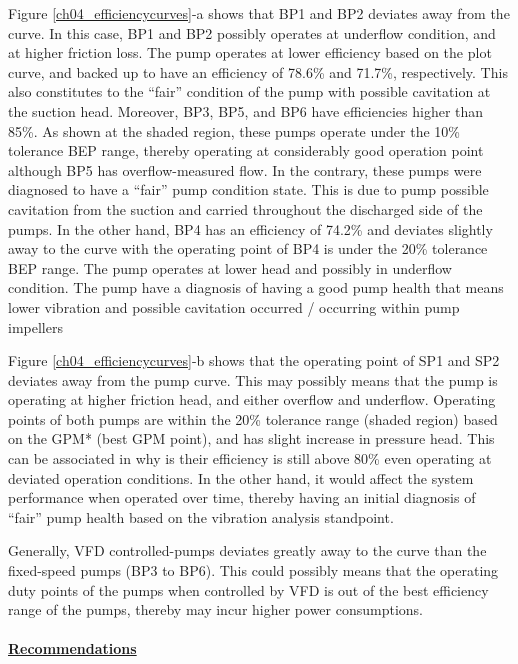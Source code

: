 Figure \ref{ch04_efficiencycurves}-a shows that BP1 and BP2 deviates away from the curve. In this case, BP1 and BP2 possibly operates at underflow condition, and at higher friction loss. The pump operates at lower efficiency based on the plot curve, and backed up to have an efficiency of 78.6\% and 71.7\%, respectively. This also constitutes to the “fair” condition of the pump with possible cavitation at the suction head. Moreover, BP3, BP5, and BP6 have efficiencies higher than 85\%. As shown at the shaded region, these pumps operate under the 10\% tolerance BEP range, thereby operating at considerably good operation point although BP5 has overflow-measured flow. In the contrary, these pumps were diagnosed to have a “fair” pump condition state. This is due to pump possible cavitation from the suction and carried throughout the discharged side of the pumps. In the other hand, BP4 has an efficiency of 74.2\% and deviates slightly away to the curve with the operating point of BP4 is under the 20\% tolerance BEP range. The pump operates at lower head and possibly in underflow condition. The pump have a diagnosis of having a good pump health that means lower vibration and possible cavitation occurred / occurring within pump impellers

Figure \ref{ch04_efficiencycurves}-b shows that the operating point of SP1 and SP2 deviates away from the pump curve. This may possibly means that the pump is operating at higher friction head, and either overflow and underflow. Operating points of both pumps are within the 20\% tolerance range (shaded region) based on the GPM* (best GPM point), and has slight increase in pressure head. This can be associated in why is their efficiency is still above 80\% even operating at deviated operation conditions. In the other hand, it would affect the system performance when operated over time, thereby having an initial diagnosis of “fair” pump health based on the vibration analysis standpoint. 

Generally, VFD controlled-pumps deviates greatly away to the curve than the fixed-speed pumps (BP3 to BP6). This could possibly means that the operating duty points of the pumps when controlled by VFD is out of the best efficiency range of the pumps, thereby may incur higher power consumptions. 

\paragraph{\underline{Recommendations}}

